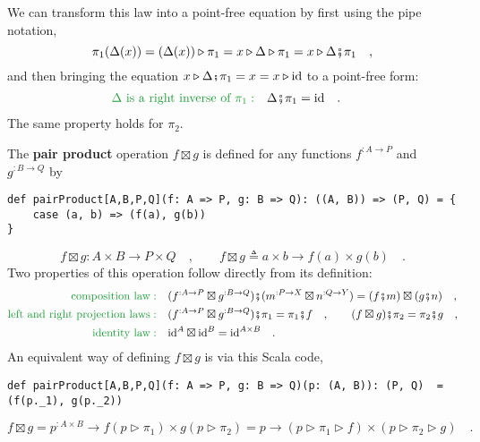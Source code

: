 We can transform this law into a point-free equation by first using
the pipe notation,
\[
\pi_{1}(\Delta(x))=(\Delta(x))\triangleright\pi_{1}=x\triangleright\Delta\triangleright\pi_{1}=x\triangleright\Delta\bef\pi_{1}\quad,
\]
and then bringing the equation $x\triangleright\Delta\bef\pi_{1}=x=x\triangleright\text{id}$
to a point-free form: 
\begin{align}
{\color{greenunder}\Delta\text{ is a right inverse of }\pi_{1}:}\quad & \Delta\bef\pi_{1}=\text{id}\quad.\label{eq:pair-identity-law-left}
\end{align}
The same property holds for $\pi_{2}$.

The \textbf{pair product} operation
$f\boxtimes g$ is defined for any functions $f^{:A\rightarrow P}$
and $g^{:B\rightarrow Q}$ by
\begin{lstlisting}
def pairProduct[A,B,P,Q](f: A => P, g: B => Q): ((A, B)) => (P, Q) = {
    case (a, b) => (f(a), g(b))
}
\end{lstlisting}
\[
f\boxtimes g:A\times B\rightarrow P\times Q\quad,\quad\quad f\boxtimes g\triangleq a\times b\rightarrow f(a)\times g(b)\quad.
\]
Two properties of this operation follow directly from its definition:
\begin{align}
{\color{greenunder}\text{composition law}:}\quad & (f^{:A\rightarrow P}\boxtimes g^{:B\rightarrow Q})\bef(m^{:P\rightarrow X}\boxtimes n^{:Q\rightarrow Y})=(f\bef m)\boxtimes(g\bef n)\quad,\label{eq:pair-product-composition-law}\\
{\color{greenunder}\text{left and right projection laws}:}\quad & (f^{:A\rightarrow P}\boxtimes g^{:B\rightarrow Q})\bef\pi_{1}=\pi_{1}\bef f\quad,\quad\quad(f\boxtimes g)\bef\pi_{2}=\pi_{2}\bef g\quad,\label{eq:pair-product-projection-laws}\\
{\color{greenunder}\text{identity law}:}\quad & \text{id}^{A}\boxtimes\text{id}^{B}=\text{id}^{A\times B}\quad.\nonumber 
\end{align}
An equivalent way of defining $f\boxtimes g$ is via this Scala code,
\begin{lstlisting}
def pairProduct[A,B,P,Q](f: A => P, g: B => Q)(p: (A, B)): (P, Q)  =  (f(p._1), g(p._2))
\end{lstlisting}
\[
f\boxtimes g=p^{:A\times B}\rightarrow f(p\triangleright\pi_{1})\times g(p\triangleright\pi_{2})=p\rightarrow(p\triangleright\pi_{1}\triangleright f)\times(p\triangleright\pi_{2}\triangleright g)\quad.
\]

